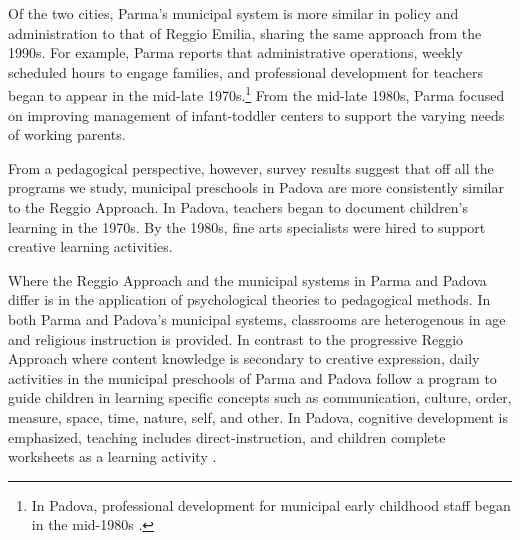 Of the two cities, Parma's municipal system is more similar in policy and administration to that of Reggio Emilia, sharing the same approach from the 1990s. For example, Parma reports that administrative operations, weekly scheduled hours to engage families, and professional development for teachers began to appear in the mid-late 1970s.\footnote{In Padova, professional development for municipal early childhood staff began in the mid-1980s \citep{Becchi-Ferrari_1990_Pub-Inf-Centres-Italy}.} From the mid-late 1980s, Parma focused on improving management of infant-toddler centers to support the varying needs of working parents.

From a pedagogical perspective, however, survey results suggest that off all the programs we study, municipal preschools in Padova are more consistently similar to the Reggio Approach. In Padova, teachers began to document children's learning in the 1970s. By the 1980s, fine arts specialists were hired to support creative learning activities.

Where the Reggio Approach and the municipal systems in Parma and Padova differ is in the application of psychological theories to pedagogical methods. In both Parma and Padova's municipal systems, classrooms are heterogenous in age and religious instruction is provided. In contrast to the progressive Reggio Approach where content knowledge is secondary to creative expression, daily activities in the municipal preschools of Parma and Padova follow a program to guide children in learning specific concepts such as communication, culture, order, measure, space, time, nature, self, and other. In Padova, cognitive development is emphasized, teaching includes direct-instruction, and children complete worksheets as a learning activity \citep{CEHD_2016_Historical-Analysis}.

